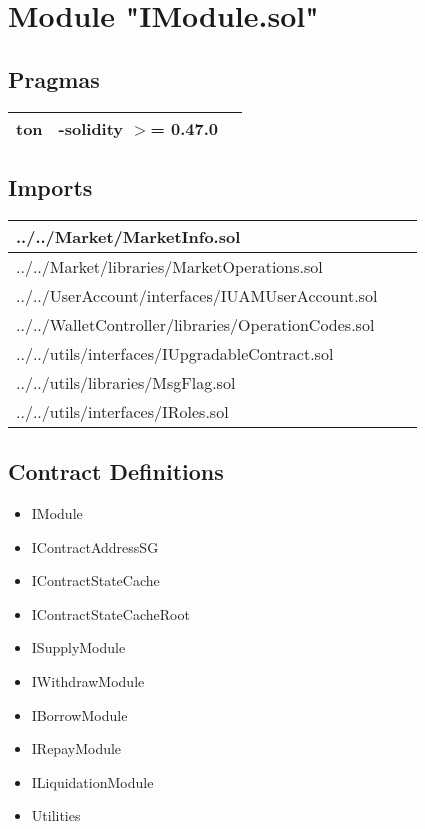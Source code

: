 
\section{Module "IModule.sol"}


\subsection{Pragmas}


\noindent\begin{tabular}{|l|l|p{5cm}|}\hline
ton & -solidity $>$= 0.47.0 &\\\hline
\end{tabular}


\subsection{Imports}


\noindent\begin{tabular}{|l|l|p{5cm}|}\hline
../../Market/MarketInfo.sol &\\\hline
../../Market/libraries/MarketOperations.sol &\\\hline
../../UserAccount/interfaces/IUAMUserAccount.sol &\\\hline
../../WalletController/libraries/OperationCodes.sol &\\\hline
../../utils/interfaces/IUpgradableContract.sol &\\\hline
../../utils/libraries/MsgFlag.sol &\\\hline
../../utils/interfaces/IRoles.sol &\\\hline
\end{tabular}


\subsection{Contract Definitions}

\begin{itemize}
\item IModule
\item IContractAddressSG
\item IContractStateCache
\item IContractStateCacheRoot
\item ISupplyModule
\item IWithdrawModule
\item IBorrowModule
\item IRepayModule
\item ILiquidationModule
\item Utilities
\end{itemize}
